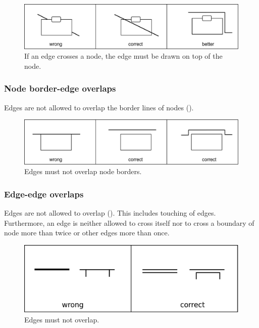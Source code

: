 \begin{figure}[h!]
  \centering
  \includegraphics[scale=0.3]{images/layout-node-edge}
  \caption{If an edge crosses a node, the edge must be drawn on top
  of the node.}\label{fig:af:layout2}
\end{figure}

\subsubsection{Node border-edge overlaps}

Edges are not allowed to overlap the border lines of nodes ().

\begin{figure}[h!]
  \centering
  \includegraphics[scale=0.3]{images/layout-node-border-edge}
  \caption{Edges must not overlap node borders.}\label{fig:af:layout3}
\end{figure}

\subsubsection{Edge-edge overlaps}

Edges are not allowed to overlap (). This includes touching of edges.
Furthermore, an edge is neither allowed to cross itself nor to cross
a boundary of node more than twice or other edges more than once.

\begin{figure}[h!]
  \centering
  \includegraphics[scale=0.3]{images/layout-edge-edge}
  \caption{Edges must not overlap.}\label{fig:af:layout4}
\end{figure}

